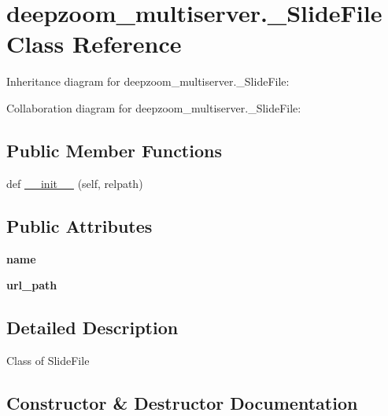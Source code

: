 \hypertarget{classdeepzoom__multiserver_1_1__SlideFile}{}\section{deepzoom\+\_\+multiserver.\+\_\+\+Slide\+File Class Reference}
\label{classdeepzoom__multiserver_1_1__SlideFile}


Inheritance diagram for deepzoom\+\_\+multiserver.\+\_\+\+Slide\+File\+:


Collaboration diagram for deepzoom\+\_\+multiserver.\+\_\+\+Slide\+File\+:
\subsection*{Public Member Functions}
\begin{DoxyCompactItemize}
\item 
def \hyperlink{classdeepzoom__multiserver_1_1__SlideFile_a59f3ca2ee947c828203b365ab9a8db69}{\+\_\+\+\_\+init\+\_\+\+\_\+} (self, relpath)
\end{DoxyCompactItemize}
\subsection*{Public Attributes}
\begin{DoxyCompactItemize}
\item 
\mbox{\label{classdeepzoom__multiserver_1_1__SlideFile_a9cbd72e57fe2011cc54cbac2eb726ee9}} 
{\bfseries name}
\item 
\mbox{\label{classdeepzoom__multiserver_1_1__SlideFile_a432d05a4d278f4d757d7b9d92451f121}} 
{\bfseries url\+\_\+path}
\end{DoxyCompactItemize}


\subsection{Detailed Description}
\begin{DoxyVerb}Class of SlideFile
\end{DoxyVerb}
 

\subsection{Constructor \& Destructor Documentation}
\mbox{\label{classdeepzoom__multiserver_1_1__SlideFile_a59f3ca2ee947c828203b365ab9a8db69}} 
